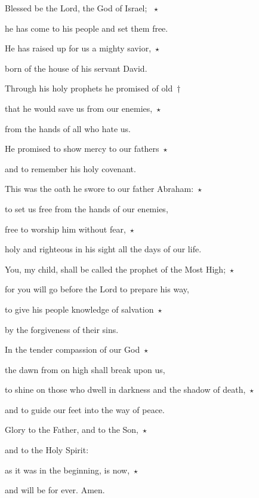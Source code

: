 \lettrine[loversize=0.15,lines=2]{B}{}lessed be the Lord, the God of Israel; ~$\star$~\nopagebreak

\hspace{2pt} he has come to his people and set them free.

\noindent He has raised up for us a mighty savior,~$\star$~\nopagebreak

born of the house of his servant David.

\noindent Through his holy prophets he promised of old~†~\nopagebreak

  that he would save us from our enemies,~$\star$~\nopagebreak

  from the hands of all who hate us.

\noindent He promised to show mercy to our fathers~$\star$~\nopagebreak


and to remember his holy covenant.

\noindent This was the oath he swore to our father Abraham:~$\star$~\nopagebreak

to set us free from the hands of our enemies,

\noindent free to worship him without fear,~$\star$~\nopagebreak

holy and righteous in his sight all the days of our life.

\noindent You, my child, shall be called the prophet of the Most High;~$\star$~\nopagebreak

for you will go before the Lord to prepare his way,

\noindent to give his people knowledge of salvation~$\star$~\nopagebreak


by the forgiveness of their sins.

\noindent In the tender compassion of our God~$\star$~\nopagebreak


the dawn from on high shall break upon us,

\noindent to shine on those who dwell in darkness and the shadow of death,~$\star$~\nopagebreak

and to guide our feet into the way of peace.

\noindent Glory to the Father, and to the Son,~$\star$~\nopagebreak

and to the Holy Spirit:

\noindent as it was in the beginning, is now,~$\star$~\nopagebreak

and will be for ever. Amen.
